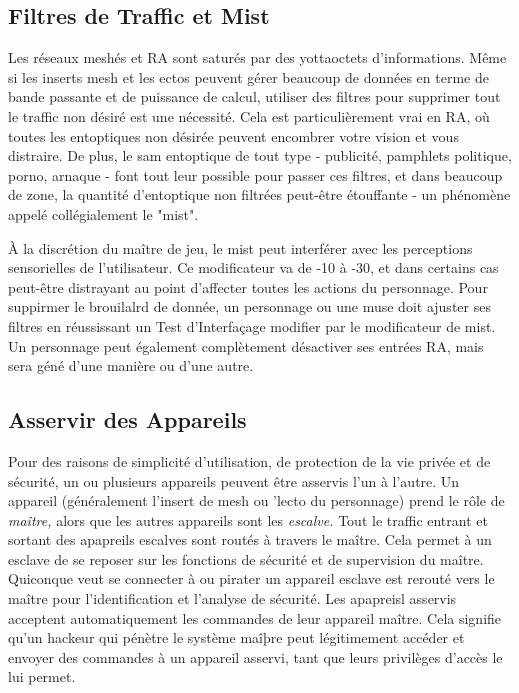 \subsection{Filtres de Traffic et Mist} 

Les réseaux meshés et RA sont saturés par des yottaoctets d'informations. Même si les inserts mesh et les ectos peuvent gérer beaucoup de données en terme de bande passante et de puissance de calcul, utiliser des filtres pour supprimer tout le traffic non désiré est une nécessité. Cela est particulièrement vrai en RA, où toutes les entoptiques non désirée peuvent encombrer votre vision et vous distraire. De plus, le sam entoptique de tout type - publicité, pamphlets politique, porno, arnaque - font tout leur possible pour passer ces filtres, et dans beaucoup de zone, la quantité d'entoptique non filtrées peut-être étouffante - un phénomène appelé collégialement le "mist". 

À la discrétion du maître de jeu, le mist peut interférer avec les perceptions sensorielles de l'utilisateur. Ce modificateur va de -10 à -30, et dans certains cas peut-être distrayant au point d'affecter toutes les actions du personnage. Pour suppirmer le brouilalrd de donnée, un personnage ou une muse doit ajuster ses filtres en réussissant un Test d'Interfaçage modifier par le modificateur de mist. Un personnage peut également complètement désactiver ses entrées RA, mais sera géné d'une manière ou d'une autre. 

\subsection{Asservir des Appareils} 



Pour des raisons de simplicité d'utilisation, de protection de la vie privée et de sécurité, un ou plusieurs appareils peuvent être asservis l'un à l'autre. Un appareil (généralement l'insert de mesh ou 'lecto du personnage) prend le rôle de \textit{maître,} alors que les autres appareils sont les \textit{escalve.} Tout le traffic entrant et sortant des apapreils escalves sont routés à travers le maître. Cela permet à un esclave de se reposer sur les fonctions de sécurité et de supervision du maître. Quiconque veut se connecter à ou pirater un appareil esclave est rerouté vers le maître pour l'identification et l'analyse de sécurité. Les apapreisl asservis acceptent automatiquement les commandes de leur appareil maître. Cela signifie qu'un hackeur qui pénètre le système maîþre peut légitimement accéder et envoyer des commandes à un appareil asservi, tant que leurs privilèges d'accès le lui permet. 

